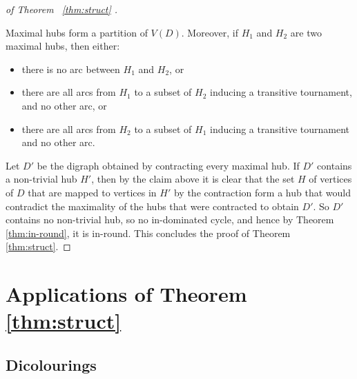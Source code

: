 \begin{proof}[of Theorem ~\ref{thm:struct} ]
\begin{claim} Maximal hubs form a partition of $V(D)$. Moreover, if $H_{1}$ and $H_{2}$ are two maximal hubs, then either:
\begin{itemize}
\item  there is no arc between $H_1$ and $H_2$, or
\item  there are all arcs from $H_{1}$ to a subset of $H_{2}$ inducing a transitive tournament, and no other arc, or
\item  there are all arcs from $H_{2}$ to a subset of $H_{1}$ inducing a transitive tournament and no other arc. 
\end{itemize}

\end{claim}

Let $D'$ be the digraph obtained by contracting every maximal hub. If $D'$ contains a non-trivial hub $H'$, then by the claim above it is clear that the set $H$ of vertices of $D$ that are mapped to vertices in $H'$ by the contraction form a hub that would contradict the maximality of the hubs that were contracted to obtain $D'$. So $D'$ contains no non-trivial hub, so no in-dominated cycle, and hence by Theorem \ref{thm:in-round}, it is in-round. This concludes the proof of Theorem \ref{thm:struct}.
\end{proof}

\section{Applications of Theorem \ref{thm:struct}}
\subsection{Dicolourings}\label{sec:colouring}

